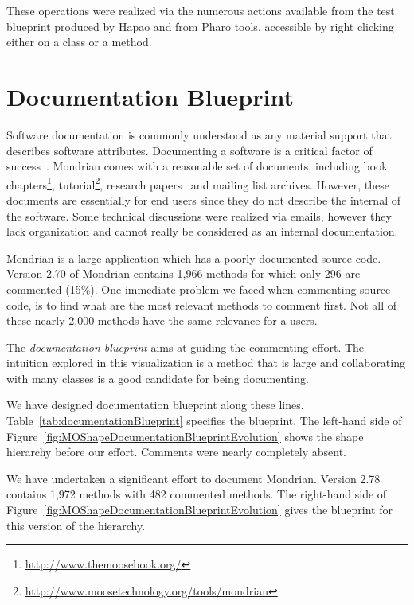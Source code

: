 \documentclass[runningheads]{llncs}
\newcommand{\figref}[1]{Figure~\ref{fig:#1}}
\newcommand{\tabref}[1]{Table~\ref{tab:#1}}
\begin{document}
These operations were realized via the numerous actions available from the test blueprint produced by Hapao and from Pharo tools, accessible by right clicking either on a class or a method. 



\section{Documentation Blueprint}

Software documentation is commonly understood as any material support that describes software attributes. Documenting a software is a critical factor of success~\cite{Paul03a}. 
Mondrian comes with a reasonable set of documents, including book chapters\footnote{\url{http://www.themoosebook.org/}}, tutorial\footnote{\url{http://www.moosetechnology.org/tools/mondrian}}, research papers~\cite{Meye06a,Lien07b} and mailing list archives. However, these documents are essentially for end users since they do not describe the internal of the software. Some technical discussions were realized via emails, however they lack organization and cannot really be considered as an internal documentation. 

Mondrian is a large application which has a poorly documented source code. Version 2.70 of Mondrian contains 1,966 methods for which only 296 are commented (15\%). One immediate problem we faced when commenting source code, is to find what are the most relevant methods to comment first. Not all of these nearly 2,000 methods have the same relevance for a users.

The \emph{documentation blueprint} aims at guiding the commenting effort. The intuition explored in this visualization is a method that is large and collaborating with many classes is a good candidate for being documenting.

We have designed documentation blueprint along these lines. \tabref{documentationBlueprint} specifies the blueprint. The left-hand side of \figref{MOShapeDocumentationBlueprintEvolution} shows the shape hierarchy before our effort. Comments were nearly completely absent.

We have undertaken a significant effort to document Mondrian. Version 2.78 contains 1,972 methods with 482 commented methods. The right-hand side of \figref{MOShapeDocumentationBlueprintEvolution} gives the blueprint for this version of the hierarchy.
\end{document}
